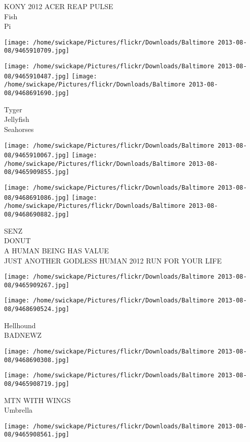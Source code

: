 \documentclass[10pt,letterpaper]{article}
\begin{document}
KONY 2012 ACER REAP PULSE\\
Fish\\
Pi
\pagebreak

\texttt{[image: /home/swickape/Pictures/flickr/Downloads/Baltimore 2013-08-08/9465910709.jpg]}

\vspace{0.25in}
\texttt{[image: /home/swickape/Pictures/flickr/Downloads/Baltimore 2013-08-08/9465910487.jpg]}
\texttt{[image: /home/swickape/Pictures/flickr/Downloads/Baltimore 2013-08-08/9468691690.jpg]}

Tyger\\
Jellyfish\\
Seahorses
\pagebreak

\texttt{[image: /home/swickape/Pictures/flickr/Downloads/Baltimore 2013-08-08/9465910067.jpg]}
\texttt{[image: /home/swickape/Pictures/flickr/Downloads/Baltimore 2013-08-08/9465909855.jpg]}

\texttt{[image: /home/swickape/Pictures/flickr/Downloads/Baltimore 2013-08-08/9468691086.jpg]}
\texttt{[image: /home/swickape/Pictures/flickr/Downloads/Baltimore 2013-08-08/9468690882.jpg]}

SENZ\\
DONUT\\
A HUMAN BEING HAS VALUE\\
JUST ANOTHER GODLESS HUMAN 2012 RUN FOR YOUR LIFE
\pagebreak

\texttt{[image: /home/swickape/Pictures/flickr/Downloads/Baltimore 2013-08-08/9465909267.jpg]}

\vspace{0.25in}
\texttt{[image: /home/swickape/Pictures/flickr/Downloads/Baltimore 2013-08-08/9468690524.jpg]}

Hellhound\\
BADNEWZ
\pagebreak

\texttt{[image: /home/swickape/Pictures/flickr/Downloads/Baltimore 2013-08-08/9468690308.jpg]}

\vspace{0.25in}
\texttt{[image: /home/swickape/Pictures/flickr/Downloads/Baltimore 2013-08-08/9465908719.jpg]}

MTN WITH WINGS\\
Umbrella
\pagebreak

\texttt{[image: /home/swickape/Pictures/flickr/Downloads/Baltimore 2013-08-08/9465908561.jpg]}
\end{document}
